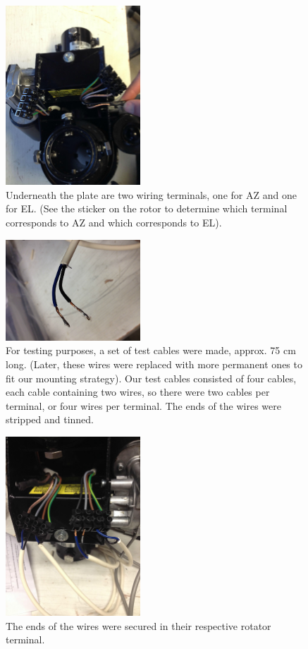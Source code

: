 \documentclass[11pt]{article} %
\begin{document}
\begin{figure}
  \centering
  \caption{Underneath the plate are two wiring terminals, one for AZ and one for EL. (See the sticker on the rotor to determine which terminal corresponds to AZ and which corresponds to EL).}
  \includegraphics[width=0.45\textwidth]{wiring/05.jpeg}
\end{figure}


\begin{figure}
  \centering
  \caption{For testing purposes, a set of test cables were made, approx. 75 cm long. (Later, these wires were replaced with more permanent ones to fit our mounting strategy). Our test cables consisted of four cables, each cable containing two wires, so there were two cables per terminal, or four wires per terminal. The ends of the wires were stripped and tinned.}
  \includegraphics[width=0.45\textwidth]{wiring/06.jpeg}
\end{figure}


\begin{figure}
  \centering
  \caption{The ends of the wires were secured in their respective rotator terminal.}
  \includegraphics[width=0.45\textwidth]{wiring/07.jpeg}
\end{figure}
\end{document}
